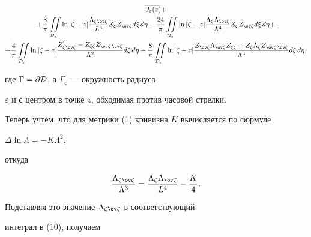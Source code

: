 \begin{multline}
\overline{J_\varepsilon(z)}+\\ 


% 


+\frac{8}{\pi}\iintl_{\cal D_\varepsilon} 


\ln|\zeta-z|\frac{\Lambda_{\zeta\ov\zeta}}{L^3}Z_\zeta Z_{\ov\zeta} 


d\xi\,d\eta-\frac{24}{\pi}\iintl_{\cal D_\varepsilon} 


\ln|\zeta-z|\frac{\Lambda_\zeta\Lambda_{\ov\zeta}}{\Lambda^4} 


Z_\zeta Z_{\ov\zeta}d\xi\,d\eta+\\ 


% 


+\frac{4}{\pi}\iintl_{\cal D_\varepsilon}\ln|\zeta-z| 


\frac{Z^2_{\zeta\ov\zeta}-Z_{\zeta\zeta}Z_{\ov\zeta\,\ov\zeta}} 


{\Lambda^2}d\xi\,d\eta+ 


\frac{8}{\pi}\iintl_{\cal D_\varepsilon}\ln|\zeta-z| 


\frac{Z_{\ov\zeta}\Lambda_{\ov\zeta}Z_{\zeta\zeta}+ 


Z_{\zeta}\Lambda_\zeta Z_{\ov\zeta\,\ov\zeta}}{\Lambda^3} 


d\xi\,d\eta, 


\end{multline} 


где $\Gamma=\partial\cal D$, а $\Gamma_\varepsilon$ --- окружность радиуса 


$\varepsilon$ и с центром в точке $z$, обходимая против часовой стрелки. 


 


Теперь учтем, что для метрики (1) кривизна $K$ вычисляется по формуле 


$\Delta\ln\Lambda=-K\Lambda^2$, 


откуда 


$$ 


\frac{\Lambda_{\zeta\ov\zeta}}{\Lambda^3}= 


\frac{\Lambda_\zeta\Lambda_{\ov\zeta}}{L^4}-\frac{K}{4}. 


$$ 


Подставляя это значение $\Lambda_{\zeta\ov\zeta}$ в соответствующий 


интеграл в (10), получаем 



